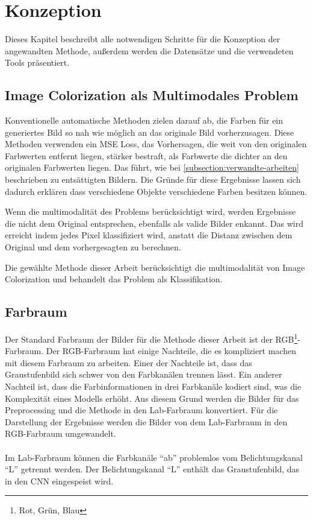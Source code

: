 \chapter{Konzeption}
Dieses Kapitel beschreibt alle notwendigen Schritte für die Konzeption der angewandten Methode, außerdem werden die Datensätze
und die verwendeten Tools präsentiert.

\section{Image Colorization als Multimodales Problem}
Konventionelle automatische Methoden zielen darauf ab, die Farben für ein generiertes Bild so nah wie möglich an das originale Bild vorherzusagen.
Diese Methoden verwenden ein MSE Loss, das Vorhersagen, die weit von den originalen Farbwerten entfernt liegen, stärker bestraft, als Farbwerte
die dichter an den originalen Farbwerten liegen. Das führt, wie bei \ref{subsection:verwandte-arbeiten} beschrieben zu entsättigten Bildern.
Die Gründe für diese Ergebnisse lassen sich dadurch erklären dass verschiedene Objekte verschiedene Farben besitzen können.

Wenn die multimodalität des Problems berücksichtigt wird, werden Ergebnisse die nicht dem Original entsprechen, ebenfalls als valide Bilder
enkannt. Das wird erreicht indem jedes Pixel klassifiziert wird, anstatt die Distanz zwischen dem Original und dem vorhergesagten zu berechnen.

Die gewählte Methode dieser Arbeit berücksichtigt die multimodalität von Image Colorization und behandelt das Problem als Klassifikation.

\section{Farbraum}
Der Standard Farbraum der Bilder für die Methode dieser Arbeit ist der RGB\footnote{Rot, Grün, Blau}-Farbraum.
Der RGB-Farbraum hat einige Nachteile, die es kompliziert
machen mit diesem Farbraum zu arbeiten. Einer der Nachteile ist, dass das Graustufenbild sich schwer von den Farbkanälen trennen lässt. Ein anderer
Nachteil ist, dass die Farbinformationen in drei Farbkanäle kodiert sind, was die Komplexität eines Modells erhöht. Aus diesem Grund
werden die Bilder für das Preprocessing und die Methode in den Lab-Farbraum konvertiert. Für die Darstellung der Ergebnisse werden die Bilder
von dem Lab-Farbraum in den RGB-Farbraum umgewandelt.
\\
\\
Im Lab-Farbraum können die Farbkanäle ``ab'' problemlos vom Belichtungskanal ``L'' getrennt werden. Der Belichtungskanal ``L''
enthält das Graustufenbild, das in den CNN eingespeist wird.

